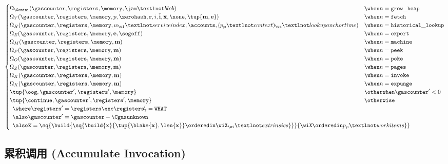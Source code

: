 \begin{align}
\begin{cases}
      \Omega_\Gemini(\gascounter, \registers, \memory, \jam¬blob) &\when n = \mathtt{grow\_heap} \\
      \Omega_Y(\gascounter, \registers, \memory, p, \zerohash, \mathbf{r}, i, \overline{\mathbf{i}}, \overline{\mathbf{x}}, \none, \tup{\mathbf{m}, \mathbf{e}}) &\when n = \mathtt{fetch}\\
      \Omega_H(\gascounter, \registers, \memory, w_\wi¬serviceindex, \accounts, (p_\wp¬context)_\wc¬lookupanchortime) &\when n = \mathtt{historical\_lookup}\\
      \Omega_E(\gascounter, \registers, \memory, \mathbf{e}, \segoff) &\when n = \mathtt{export}\\
      \Omega_M(\gascounter, \registers, \memory, \mathbf{m}) &\when n = \mathtt{machine}\\
      \Omega_P(\gascounter, \registers, \memory, \mathbf{m}) &\when n = \mathtt{peek}\\
      \Omega_O(\gascounter, \registers, \memory, \mathbf{m}) &\when n = \mathtt{poke}\\
      \Omega_Z(\gascounter, \registers, \memory, \mathbf{m}) &\when n = \mathtt{pages}\\
      \Omega_K(\gascounter, \registers, \memory, \mathbf{m}) &\when n = \mathtt{invoke}\\
      \Omega_X(\gascounter, \registers, \memory, \mathbf{m}) &\when n = \mathtt{expunge}\\
      \tup{\oog, \gascounter', \registers', \memory} &\otherwhen \gascounter' < 0\\
      \tup{\continue, \gascounter', \registers', \memory} &\otherwise\\
      \multicolumn{2}{l}{\where \registers' = \registers \exc \registers'_7 = \mathtt{WHAT}} \\
      \multicolumn{2}{l}{\also \gascounter' = \gascounter - \Cgasunknown} \\
      \multicolumn{2}{l}{\also \overline{\mathbf{x}} = \sq{\build{
        \sq{\build{
          \mathbf{x}
        }{
          \tup{\blake{\mathbf{x}}, \len{\mathbf{x}}} \orderedin \wiX_\wi¬extrinsics
        }}
      }{
        \wiX \orderedin p_\wp¬workitems
      }}}
    \end{cases}
\end{align}

\subsection{累积调用 (Accumulate Invocation)}\label{sec:accumulateinvocation}

